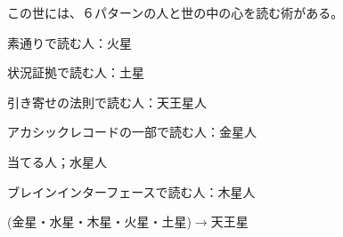 \documentclass{jsarticle}
\begin{document}
\title{}
\author{}
\date{}
\maketitle

  この世には、６パターンの人と世の中の心を読む術がある。


  素通りで読む人：火星


  状況証拠で読む人：土星


  引き寄せの法則で読む人：天王星人


  アカシックレコードの一部で読む人：金星人


  当てる人；水星人


  ブレインインターフェースで読む人：木星人



  (金星・水星・木星・火星・土星)$\to$天王星 
\end{document}

